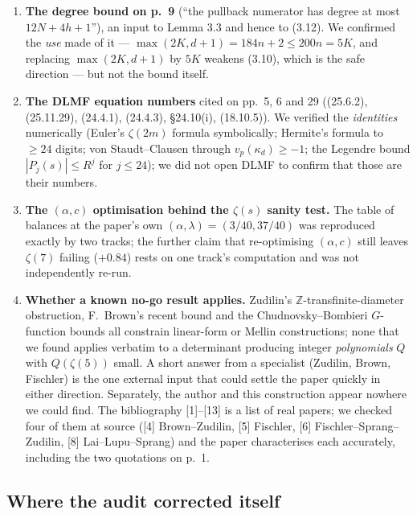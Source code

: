 \documentclass[11pt]{article}
\theoremstyle{definition}
\newcommand{\z}{\zeta(5)}
\begin{document}
\begin{enumerate}
in any of them, and Lemma 4.2's statement is a finite claim about $h\times h$ matrices that
6000 random instances did not break; but a machine-checked proof is the thing that would settle
them.
\item \textbf{The degree bound on p.~9} (``the pullback numerator has degree at most
$12N+4h+1$''), an input to Lemma 3.3 and hence to (3.12). We confirmed the \emph{use} made of
it --- $\max(2K,d+1)=184n+2\le200n=5K$, and replacing $\max(2K,d+1)$ by $5K$ weakens (3.10),
which is the safe direction --- but not the bound itself.
\item \textbf{The DLMF equation numbers} cited on pp.~5, 6 and 29 ((25.6.2), (25.11.29),
(24.4.1), (24.4.3), \S24.10(i), (18.10.5)). We verified the \emph{identities} numerically
(Euler's $\zeta(2m)$ formula symbolically; Hermite's formula to $\ge24$ digits; von
Staudt--Clausen through $v_p(\kappa_d)\ge-1$; the Legendre bound $|P_j(s)|\le R^j$ for
$j\le24$); we did not open DLMF to confirm that those are their numbers.
\item \textbf{The $(\alpha,c)$ optimisation behind the $\zeta(s)$ sanity test.} The table of
balances at the paper's own $(\alpha,\lambda)=(3/40,37/40)$ was reproduced exactly by two
tracks; the further claim that re-optimising $(\alpha,c)$ still leaves $\zeta(7)$ failing
($+0.84$) rests on one track's computation and was not independently re-run.
\item \textbf{Whether a known no-go result applies.} Zudilin's $\mathbb{Z}$-transfinite-diameter
obstruction, F.~Brown's recent bound and the Chudnovsky--Bombieri $G$-function bounds all
constrain linear-form or Mellin constructions; none that we found applies verbatim to a
determinant producing integer \emph{polynomials} $Q$ with $Q(\z)$ small. A short answer from a
specialist (Zudilin, Brown, Fischler) is the one external input that could settle the paper
quickly in either direction. Separately, the author and this construction appear nowhere we
could find. The bibliography [1]--[13] is a list of real papers; we checked four of them at
source ([4] Brown--Zudilin, [5] Fischler, [6] Fischler--Sprang--Zudilin, [8] Lai--Lupu--Sprang)
and the paper characterises each accurately, including the two quotations on p.~1.
\end{enumerate}

\subsection{Where the audit corrected itself}\label{sec:disagree}
\end{document}
